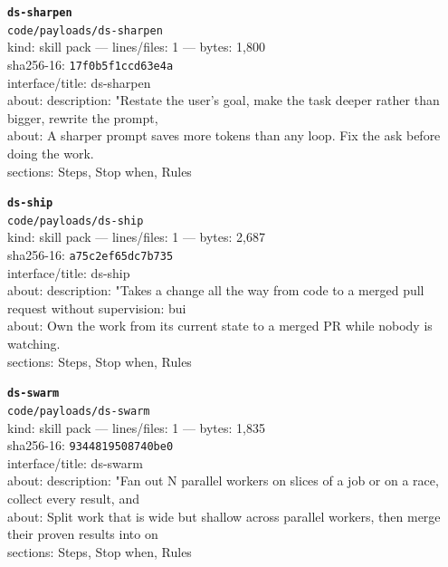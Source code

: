 \noindent\textbf{\texttt{ds-sharpen}}\\
\texttt{code/payloads/ds-sharpen}\\
kind: skill pack --- lines/files: 1 --- bytes: 1,800\\
sha256-16: \texttt{17f0b5f1ccd63e4a}\\
interface/title: ds-sharpen\\
about: description: "Restate the user's goal, make the task deeper rather than bigger, rewrite the prompt, \\
about: A sharper prompt saves more tokens than any loop. Fix the ask before doing the work.\\
sections: Steps, Stop when, Rules\\
\vspace*{6.0pt}
\newpage

\noindent\textbf{\texttt{ds-ship}}\\
\texttt{code/payloads/ds-ship}\\
kind: skill pack --- lines/files: 1 --- bytes: 2,687\\
sha256-16: \texttt{a75c2ef65dc7b735}\\
interface/title: ds-ship\\
about: description: "Takes a change all the way from code to a merged pull request without supervision: bui\\
about: Own the work from its current state to a merged PR while nobody is watching.\\
sections: Steps, Stop when, Rules\\
\vspace*{6.0pt}

\noindent\textbf{\texttt{ds-swarm}}\\
\texttt{code/payloads/ds-swarm}\\
kind: skill pack --- lines/files: 1 --- bytes: 1,835\\
sha256-16: \texttt{9344819508740be0}\\
interface/title: ds-swarm\\
about: description: "Fan out N parallel workers on slices of a job or on a race, collect every result, and \\
about: Split work that is wide but shallow across parallel workers, then merge their proven results into on\\
sections: Steps, Stop when, Rules\\
\vspace*{6.0pt}

